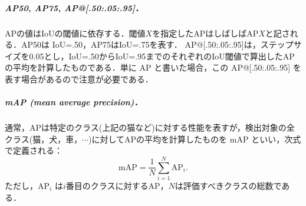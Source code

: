\documentclass[twocolumn]{jsarticle} %
\begin{document}
\subparagraph{AP50, AP75, AP@[.50:.05:.95]．} APの値はIoUの閾値に依存する．閾値$X$を指定したAPはしばしばAP$X$と記される．AP50は IoU=.50，AP75はIoU=.75を表す．
AP@[.50:.05:.95]は，ステップサイズを0.05とし，IoU=.50からIoU=.95までのそれぞれのIoU閾値で算出したAPの平均を計算したものである．単に AP と書いた場合，この AP@[.50:.05:.95] を表す場合があるので注意が必要である．

\subparagraph{mAP (mean average precision)．} 通常，APは特定のクラス(上記の猫など)に対する性能を表すが，検出対象の全クラス(猫，犬，車，$\cdots$)に対してAPの平均を計算したものを mAP といい，次式で定義される：
$$ \mbox{mAP} = \frac{1}{N} \sum^N_{i{=}1} \mbox{AP}_i. $$
ただし，AP$_i$ は$i$番目のクラスに対するAP，$N$は評価すべきクラスの総数である．
\end{document}
